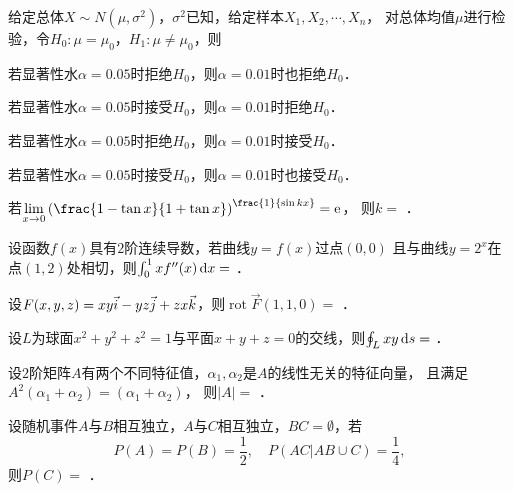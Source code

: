 \documentclass[plain,noanswer,medmath]{../../template/jnuexam}
\begin{document}
\begin{problem}
给定总体$X\sim N\left(\mu ,\sigma^2 \right)$，$\sigma^2$已知，给定样本$X_1,X_2, \cdots ,X_n$，
对总体均值$\mu$进行检验，令$H_0:\mu = \mu_0$，$H_1:\mu \ne \mu_0$，则\pickout{}
\begin{abcd}
\item 若显著性水$\alpha = 0.05$时拒绝$H_0$，则$\alpha = 0.01$时也拒绝$H_0$．
\item 若显著性水$\alpha = 0.05$时接受$H_0$，则$\alpha = 0.01$时拒绝$H_0$．
\item 若显著性水$\alpha = 0.05$时拒绝$H_0$，则$\alpha = 0.01$时接受$H_0$．
\item 若显著性水$\alpha = 0.05$时接受$H_0$，则$\alpha = 0.01$时也接受$H_0$．
\end{abcd}
\end{problem}




\begin{problem}
若$\lim_{x \to 0} \left(\frac{1 - \tan x}{1 + \tan x} \right)^{\frac{1}{\sin kx}} = \e$，
则$k =$ \fillin{}．
\end{problem}


\begin{problem}
设函数$f(x)$具有$2$阶连续导数，若曲线$y = f(x)$过点$(0,0)$
且与曲线$y = 2^x$在点$(1,2)$处相切，则$\int_0^1 xf''(x)\mathop{}\!\mathrm{d} x =$ \fillin{}．
\end{problem}


\begin{problem}
设$F(x,y,z) = xy\vec{i} - yz\vec{j} + zx\vec{k}$，则$\operatorname{rot}\vec{F}(1,1,0) =$ \fillin{}．
\end{problem}


\begin{problem}
设$L$为球面$x^2 + y^2 + z^2 = 1$与平面$x + y + z = 0$的交线，则$\oint_L xy\mathop{}\!\mathrm{d} s =$ \fillin{}．
\end{problem}


\begin{problem}
设$2$阶矩阵$A$有两个不同特征值，$\alpha_1,\alpha_2$是$A$的线性无关的特征向量，
且满足$A^2(\alpha_1 + \alpha_2) = (\alpha_1 + \alpha_2)$，
则$|A| =$ \fillin{}．
\end{problem}


\begin{problem}
设随机事件$A$与$B$相互独立，$A$与$C$相互独立，$BC = \emptyset$，若
$$P(A) = P(B) = \frac{1}{2},\quad P\left(AC|AB \cup C \right) = \frac{1}{4},$$
则$P(C) =$ \fillin{}．
\end{problem}
\end{document}
